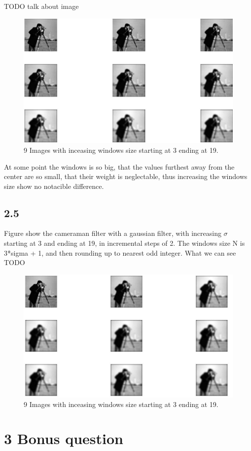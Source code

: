 \documentclass[11pt]{report}
\begin{document}
TODO talk about image
\begin{figure}[!ht]
    \centering
    \includegraphics[width=1\textwidth]{fig24.jpg}
    \caption{9 Images with inceasing windows size starting at 3 ending at 19.}
    \label{fig:2_4}
\end{figure}

At some point the windows is so big, that the values furthest away from the center are so small, that their weight is neglectable, thus increasing the windows size show no notacible difference.

\subsection{2.5}

Figure  show the cameraman filter with a gaussian filter, with increasing $\sigma$ starting at 3 and ending at 19, in incremental steps of 2. The windows size N is 3*sigma + 1, and then rounding up to nearest odd integer. What we can see TODO
\begin{figure}[!ht]
    \centering
    \includegraphics[width=1\textwidth]{fig25.jpg}
    \caption{9 Images with inceasing windows size starting at 3 ending at 19.}
    \label{fig:2_5}
\end{figure}

\section{3 Bonus question}
\end{document}
